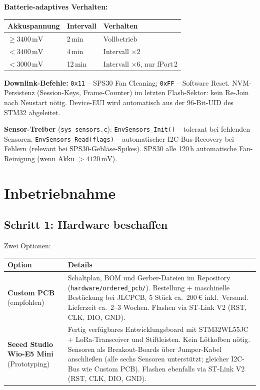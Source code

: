 \documentclass[11pt,a4paper]{scrartcl}
\begin{document}
\textbf{Batterie-adaptives Verhalten:}

\begin{table}[H]
  \centering
  \begin{tabular}{lll}
    \hline
    \textbf{Akkuspannung} & \textbf{Intervall} & \textbf{Verhalten} \\
    \hline
    $\geq 3400\,\text{mV}$ & 2\,min & Vollbetrieb \\
    $< 3400\,\text{mV}$ & 4\,min & Intervall $\times2$ \\
    $< 3000\,\text{mV}$ & 12\,min & Intervall $\times6$, nur fPort\,2 \\
    \hline
  \end{tabular}
\end{table}

\textbf{Downlink-Befehle:} \texttt{0x11} – SPS30 Fan Cleaning; \texttt{0xFF} – Software Reset. NVM-Persistenz (Session-Keys, Frame-Counter) im letzten Flash-Sektor: kein Re-Join nach Neustart nötig. Device-EUI wird automatisch aus der 96-Bit-UID des STM32 abgeleitet.

\textbf{Sensor-Treiber} (\texttt{sys\_sensors.c}): \texttt{EnvSensors\_Init()} – tolerant bei fehlenden Sensoren. \texttt{EnvSensors\_Read(flags)} – automatischer I2C-Bus-Recovery bei Fehlern (relevant bei SPS30-Gebläse-Spikes). SPS30 alle 120\,h automatische Fan-Reinigung (wenn Akku $> 4120\,\text{mV}$).

\section{Inbetriebnahme}

\subsection*{Schritt 1: Hardware beschaffen}

Zwei Optionen:

\begin{table}[H]
  \centering
  \begin{tabular}{lp{9cm}}
    \hline
    \textbf{Option} & \textbf{Details} \\
    \hline
    \textbf{Custom PCB} (empfohlen) &
      Schaltplan, BOM und Gerber-Dateien im Repository (\texttt{hardware/ordered\_pcb/}).
      Bestellung + maschinelle Bestückung bei JLCPCB, 5 Stück ca.~200\,€ inkl.\ Versand.
      Lieferzeit ca.\ 2–3 Wochen. Flashen via ST-Link V2 (RST, CLK, DIO, GND). \\[4pt]
    \textbf{Seeed Studio Wio-E5 Mini} (Prototyping) &
      Fertig verfügbares Entwicklungsboard mit STM32WL55JC + LoRa-Transceiver und
      Stiftleisten. Kein Lötkolben nötig. Sensoren als Breakout-Boards über
      Jumper-Kabel anschließen (alle sechs Sensoren unterstützt; gleicher I2C-Bus
      wie Custom PCB). Flashen ebenfalls via ST-Link V2 (RST, CLK, DIO, GND). \\
    \hline
  \end{tabular}
\end{table}
\end{document}

